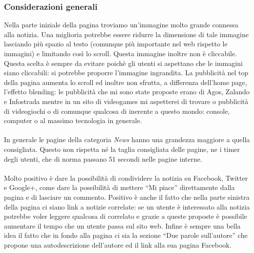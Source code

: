 \documentclass[../ProgettoTecWeb2.tex]{subfiles}
\begin{document}
		\subsubsection{Considerazioni generali}
		Nella parte iniziale della pagina troviamo un'immagine molto grande connessa alla notizia. Una miglioria potrebbe essere ridurre la dimensione di tale immagine lasciando più spazio al testo (comunque più importante nel web rispetto le immagini) e limitando così lo scroll. Questa immagine inoltre non è cliccabile. Questa scelta è sempre da evitare poichè gli utenti si aspettano che le immagini siano cliccabili: si potrebbe proporre l'immagine ingrandita. La pubblicità nel top della pagina aumenta lo scroll ed inoltre non sfrutta, a differenza dell'home page, l'effetto blending: le pubblicità che mi sono state proposte erano di Agos, Zalando e Infostrada mentre in un sito di videogames mi aspetterei di trovare o pubblicità di videogiochi o di comunque qualcosa di inerente a questo mondo: console, computer o al massimo tecnologia in generale. 

		\paragraph{}
		In generale le pagine della categoria \textit{News} hanno una grandezza maggiore a quella consigliata. Questo non rispetta né la taglia consigliata delle pagine, ne i timer degli utenti, che di norma passano 51 secondi nelle pagine interne. 

		\paragraph{}
		Molto positivo è dare la possibilità di condividere la notizia su Facebook, Twitter e Google+, come dare la possibilità di mettere ``Mi piace'' direttamente dalla pagina e di lasciare un commento. Positivo è anche il fatto che nella parte sinistra della pagina ci siano link a notizie correlate: se un utente è interessato alla notizia potrebbe voler leggere qualcosa di correlato e grazie a queste proposte è possibile aumentare il tempo che un utente passa sul sito web. Infine è sempre una bella idea il fatto che in fondo alla pagina ci sia la sezione ``Due parole sull'autore'' che propone una autodescrizione dell'autore ed il link alla sua pagina Facebook.

	\newpage
\end{document}
